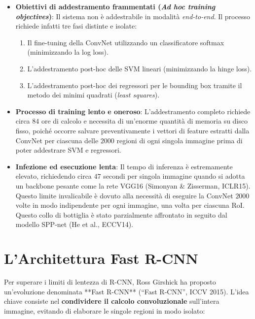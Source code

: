 ﻿\documentclass[11pt, a4paper]{article}
\begin{document}
\begin{itemize}[noitemsep]
    \item \textbf{Obiettivi di addestramento frammentati (\emph{Ad hoc training objectives})}: Il sistema non è addestrabile in modalità \emph{end-to-end}. Il processo richiede infatti tre fasi distinte e isolate:
    \begin{enumerate}[noitemsep]
        \item Il fine-tuning della ConvNet utilizzando un classificatore softmax (minimizzando la log loss).
        \item L'addestramento post-hoc delle SVM lineari (minimizzando la hinge loss).
        \item L'addestramento post-hoc dei regressori per le bounding box tramite il metodo dei minimi quadrati (\emph{least squares}).
    \end{enumerate}
    \item \textbf{Processo di training lento e oneroso}: L'addestramento completo richiede circa $84$ ore di calcolo e necessita di un'enorme quantità di memoria su disco fisso, poiché occorre salvare preventivamente i vettori di feature estratti dalla ConvNet per ciascuna delle $2000$ regioni di ogni singola immagine prima di poter addestrare SVM e regressori.
    \item \textbf{Infezione ed esecuzione lenta}: Il tempo di inferenza è estremamente elevato, richiedendo circa $47$ secondi per singola immagine quando si adotta un backbone pesante come la rete VGG16 (Simonyan \& Zisserman, ICLR15). Questo limite invalicabile è dovuto alla necessità di eseguire la ConvNet $2000$ volte in modo indipendente per ogni immagine, una volta per ciascuna RoI. Questo collo di bottiglia è stato parzialmente affrontato in seguito dal modello SPP-net (He et al., ECCV14).
\end{itemize}

\newpage

\section{L'Architettura Fast R-CNN}

Per superare i limiti di lentezza di R-CNN, Ross Girshick ha proposto un'evoluzione denominata **Fast R-CNN** (``Fast R-CNN'', ICCV 2015). L'idea chiave consiste nel \textbf{condividere il calcolo convoluzionale} sull'intera immagine, evitando di elaborare le singole regioni in modo isolato:

\end{document}
